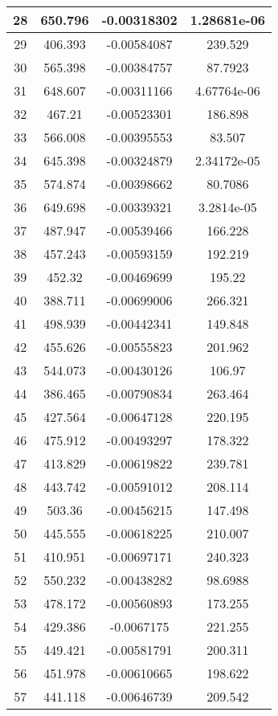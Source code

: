 \begin{table}[h]
{\begin{tabular}{|c|c|c|c|}
28	&	650.796	&	-0.00318302	&	1.28681e-06	\\	\hline
29	&	406.393	&	-0.00584087	&	239.529	\\	\hline
30	&	565.398	&	-0.00384757	&	87.7923	\\	\hline
31	&	648.607	&	-0.00311166	&	4.67764e-06	\\	\hline
32	&	467.21	&	-0.00523301	&	186.898	\\	\hline
33	&	566.008	&	-0.00395553	&	83.507	\\	\hline
34	&	645.398	&	-0.00324879	&	2.34172e-05	\\	\hline
35	&	574.874	&	-0.00398662	&	80.7086	\\	\hline
36	&	649.698	&	-0.00339321	&	3.2814e-05	\\	\hline
37	&	487.947	&	-0.00539466	&	166.228	\\	\hline
38	&	457.243	&	-0.00593159	&	192.219	\\	\hline
39	&	452.32	&	-0.00469699	&	195.22	\\	\hline
40	&	388.711	&	-0.00699006	&	266.321	\\	\hline
41	&	498.939	&	-0.00442341	&	149.848	\\	\hline
42	&	455.626	&	-0.00555823	&	201.962	\\	\hline
43	&	544.073	&	-0.00430126	&	106.97	\\	\hline
44	&	386.465	&	-0.00790834	&	263.464	\\	\hline
45	&	427.564	&	-0.00647128	&	220.195	\\	\hline
46	&	475.912	&	-0.00493297	&	178.322	\\	\hline
47	&	413.829	&	-0.00619822	&	239.781	\\	\hline
48	&	443.742	&	-0.00591012	&	208.114	\\	\hline
49	&	503.36	&	-0.00456215	&	147.498	\\	\hline
50	&	445.555	&	-0.00618225	&	210.007	\\	\hline
51	&	410.951	&	-0.00697171	&	240.323	\\	\hline
52	&	550.232	&	-0.00438282	&	98.6988	\\	\hline
53	&	478.172	&	-0.00560893	&	173.255	\\	\hline
54	&	429.386	&	-0.0067175	&	221.255	\\	\hline
55	&	449.421	&	-0.00581791	&	200.311	\\	\hline
56	&	451.978	&	-0.00610665	&	198.622	\\	\hline
57	&	441.118	&	-0.00646739	&	209.542	\\	\hline

\end{tabular}}
\end{table}
